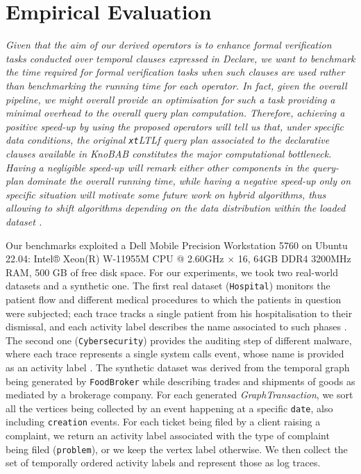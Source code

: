 \documentclass[sigconf]{acmart}
\begin{document}
\section{Empirical Evaluation}\label{sec:empeval}
\textit{Given that the aim of our derived operators is to enhance formal verification tasks conducted over temporal clauses expressed in Declare, we want to benchmark the time required for formal verification tasks when such clauses are used rather than benchmarking the running time for each operator. In fact, given the overall pipeline, we might overall provide an optimisation for such a task providing a minimal overhead to the overall query plan computation. Therefore, achieving a positive speed-up by using the proposed operators will tell us that, under specific data conditions, the original \texttt{xt}LTL\textsf{f} query plan associated to the declarative clauses available in KnoBAB constitutes the major computational bottleneck. Having a negligible speed-up will remark either other components in the query-plan dominate the overall running time, while having a negative speed-up only on specific situation will motivate some future work on hybrid algorithms, thus allowing to shift algorithms depending on the data distribution within the loaded dataset \cite{DBLP:journals/spe/Musser97}.} \medskip


Our benchmarks exploited a Dell Mobile Precision Workstation 5760 on Ubuntu 22.04: Intel® Xeon(R) W-11955M CPU @ 2.60GHz $\times$ 16, 64GB DDR4 3200MHz RAM, 500 GB of free disk space. For our experiments, we took two real-world datasets and a synthetic one. The first real dataset (\texttt{Hospital}) monitors the patient flow and different medical procedures to which the patients in question were subjected; each trace tracks a single patient from his hospitalisation to their dismissal, and each activity label describes the name associated to such phases \cite{https://doi.org/10.4121/uuid:d9769f3d-0ab0-4fb8-803b-0d1120ffcf54}. The second one (\texttt{Cybersecurity}) provides the auditing step of different malware, where each trace represents  a single system calls event, whose name is provided as an activity label \cite{10.7717/peerj-cs.346,DBLP:conf/siu/YaziCG19}.  The synthetic dataset was derived from the temporal graph being generated by \texttt{FoodBroker} \cite{DBLP:conf/wbdb/PetermannJMR14} while describing trades and shipments of goods as mediated by a brokerage company. For each generated \textit{GraphTransaction}, we sort all the vertices being collected by an event happening at a specific \texttt{date}, also including  \texttt{creation} events. For each ticket being filed by a client raising a complaint, we return an activity label associated with the type of complaint being filed (\texttt{problem}), or we keep the vertex label otherwise. We then collect the set of temporally ordered activity labels and represent those as log traces. 
\end{document}
